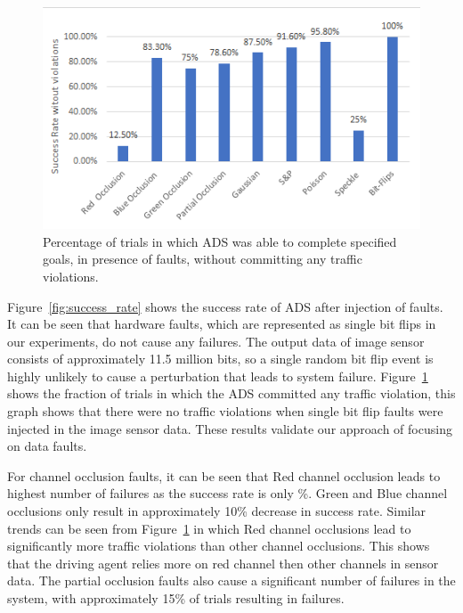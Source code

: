 \begin{figure}  
	\vspace{1.0em}
	\centering
	\includegraphics[scale=0.7]{no_violations}
	\vspace{-0.5em}
	\caption{Percentage of trials in which ADS was able to complete specified goals, in presence of faults, without committing any traffic violations.}
	\label{fig:no_violations}
	\vspace{-1.5em}
\end{figure}

Figure~\ref{fig:success_rate} shows the success rate of ADS after injection of faults. It can be seen that hardware faults, which are represented as single bit flips in our experiments, do not cause any failures. The output data of image sensor consists of approximately 11.5 million bits, so a single random bit flip event is highly unlikely to cause a perturbation that leads to system failure. Figure~\ref{fig:no_violations} shows the fraction of trials in which the ADS committed any traffic violation, this graph shows that there were no traffic violations when single bit flip faults were injected in the image sensor data. These results validate our approach of focusing on data faults.

For channel occlusion faults, it can be seen that Red channel occlusion leads to highest number of failures as the success rate is only \%. Green and Blue channel occlusions only result in approximately 10\% decrease in success rate. Similar trends can be seen from Figure~\ref{fig:no_violations} in which Red channel occlusions lead to significantly more traffic violations than other channel occlusions. This shows that the driving agent relies more on red channel then other channels in sensor data. The partial occlusion faults also cause a significant number of failures in the system, with approximately 15\% of trials resulting in failures.

